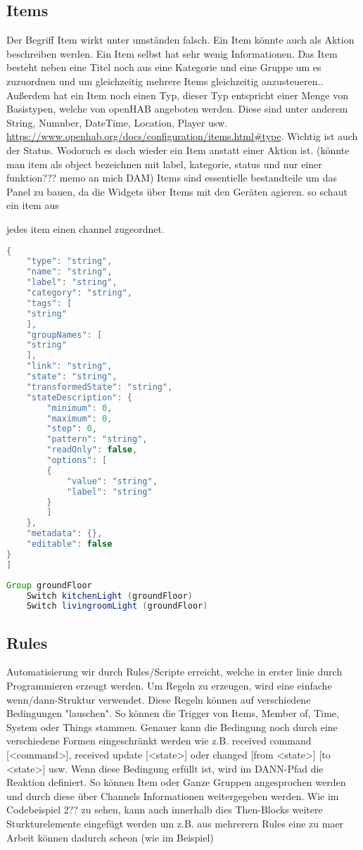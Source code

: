 \subsection{Items}

Der Begriff Item wirkt unter umständen falsch. Ein Item könnte auch als Aktion beschreiben werden. Ein Item selbst hat sehr wenig Informationen. Das Item besteht neben eine Titel noch aus eine Kategorie und eine Gruppe um es zuzuordnen und um gleichzeitig mehrere Items gleichzeitig anzusteueren.. Außerdem hat ein Item noch einen Typ, dieser Typ entspricht einer Menge von Basistypen, welche von openHAB angeboten werden. Diese sind unter anderem String, Numnber, DateTime, Location, Player usw. \url{https://www.openhab.org/docs/configuration/items.html#type}.
Wichtig ist auch der Status. Wodoruch es doch wieder ein Item anstatt einer Aktion ist. (könnte man item als object bezeichnen mit label, kategorie, status und nur einer funktion??? memo an mich DAM)
Items sind essentielle bestandteile um das Panel zu bauen, da die Widgets über Items mit den Geräten agieren.
so schaut ein item aus  

jedes item einen channel zugeordnet. 
\begin{lstlisting}[language=java,firstnumber=1,caption=Item Beispiel,label=lst:sample-item]
{
	"type": "string",
	"name": "string",
	"label": "string",
	"category": "string",
	"tags": [
	"string"
	],
	"groupNames": [
	"string"
	],
	"link": "string",
	"state": "string",
	"transformedState": "string",
	"stateDescription": {
		"minimum": 0,
		"maximum": 0,
		"step": 0,
		"pattern": "string",
		"readOnly": false,
		"options": [
		{
			"value": "string",
			"label": "string"
		}
		]
	},
	"metadata": {},
	"editable": false
}
]
\end{lstlisting}

\begin{lstlisting}[language=java,firstnumber=1,caption=Item-Gruppierung Beispiel,label=lst:group-items]
	Group groundFloor
	Switch kitchenLight (groundFloor)
	Switch livingroomLight (groundFloor)
\end{lstlisting}

\subsection{Rules}
Automatisierung wir durch Rules/Scripte erreicht, welche in erster linie durch Programmieren erzeugt werden. Um Regeln zu erzeugen, wird eine einfache wenn/dann-Struktur verwendet. Diese Regeln können auf verschiedene Bedingungen "lauschen". So können die Trigger von Items, Member of, Time, System oder Things stammen. Genauer kann die Bedingung noch durch eine verschiedene Formen eingeschränkt werden wie z.B. received command [<command>],  received update [<state>] oder changed [from <state>] [to <state>] usw.
Wenn diese Bedingung erfüllt ist, wird im DANN-Pfad die Reaktion definiert. So können Item oder Ganze Gruppen angesprochen werden und durch diese über Channels Informationen weitergegeben werden.
Wie im Codebeispiel 2?? zu sehen, kann auch innerhalb dies Then-Blocks weitere Sturkturelemente eingefügt werden um z.B. aus mehrerern Rules eine zu maer Arbeit können dadurch scheon (wie im Beispiel)

